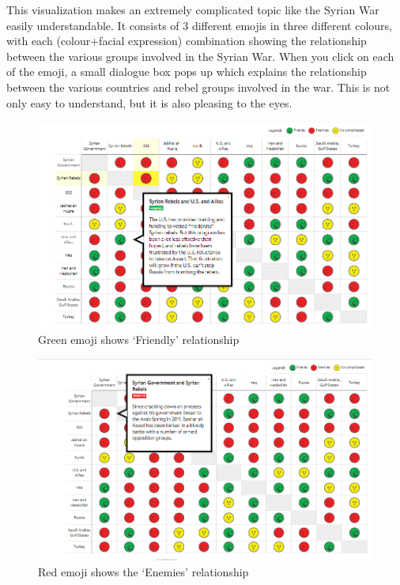 \documentclass[]{book}
\theoremstyle{definition}
\theoremstyle{definition}
\theoremstyle{definition}
\theoremstyle{remark}
\begin{document}
This visualization makes an extremely complicated topic like the Syrian
War easily understandable. It consists of 3 different emojis in three
different colours, with each (colour+facial expression) combination
showing the relationship between the various groups involved in the
Syrian War. When you click on each of the emoji, a small dialogue box
pops up which explains the relationship between the various countries
and rebel groups involved in the war. This is not only easy to
understand, but it is also pleasing to the eyes.

\begin{figure}
\centering
\includegraphics{images/img_syria_friendly.PNG}
\caption{Green emoji shows `Friendly' relationship}
\end{figure}

\begin{figure}
\centering
\includegraphics{images/img_syria_enemies.PNG}
\caption{Red emoji shows the `Enemies' relationship}
\end{figure}
\end{document}

